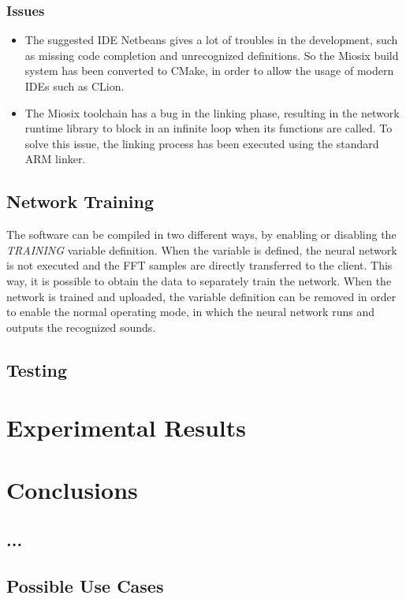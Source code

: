 \documentclass[12pt]{article}
\begin{document}
\subsubsection{Issues}
\begin{itemize}
    \item The suggested IDE Netbeans gives a lot of troubles in the development, such as missing code completion and unrecognized definitions. So the Miosix build system has been converted to CMake, in order to allow the usage of modern IDEs such as CLion.
    \item The Miosix toolchain has a bug in the linking phase, resulting in the network runtime library to block in an infinite loop when its functions are called. To solve this issue, the linking process has been executed using the standard ARM linker.
\end{itemize}

\subsection{Network Training}
The software can be compiled in two different ways, by enabling or disabling the \textit{TRAINING} variable definition. When the variable is defined, the neural network is not executed and the FFT samples are directly transferred to the client. This way, it is possible to obtain the data to separately train the network. When the network is trained and uploaded, the variable definition can be removed in order to enable the normal operating mode, in which the neural network runs and outputs the recognized sounds.

\subsection{Testing}

\section{Experimental Results}

\section{Conclusions}
\subsection{...}
\subsection{Possible Use Cases}
\end{document}
